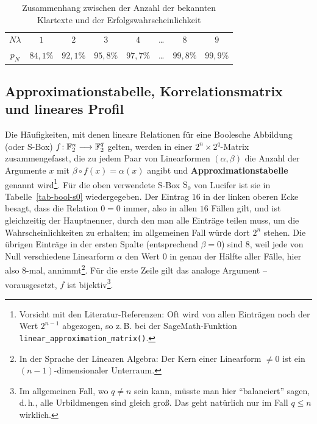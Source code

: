 \begin{refsegment}
\begin{table}
\begin{center}
  \begin{tabular}{|c|ccccccc|} \hline
		$N\lambda$ & $1$ & $2$ & $3$ & $4$ & \ldots & $8$ & $9$ \\
		$p_N$ & $84,1\%$ & $92,1\%$ & $95,8\%$ & $97,7\%$ & \ldots &
		                      $99,8\%$ & $99,9\%$ \\ \hline
  \end{tabular}
\end{center}
\caption{Zusammenhang zwischen der Anzahl der bekannten
   Klartexte
   und der Erfolgs\-wahr\-schein\-lich\-keit}\label{tab-bool-N}
\end{table}

\subsection{Approximationstabelle,
   Korrelationsmatrix und lineares
   Profil}\label{ss-bool-lpr}

Die Häufigkeiten, mit denen lineare
Relationen für eine Boolesche
Abbildung
(oder S-Box) $f\!: \mathbb{F}_2^n \longrightarrow \mathbb{F}_2^q$ gelten, werden
in einer $2^n \times 2^q$-Matrix zusammengefasst, die zu
jedem Paar von Linearformen $(\alpha,\beta)$
die Anzahl der Argumente $x$ mit $\beta\circ f(x) = \alpha(x)$ angibt und
{\bf Approximationstabelle}
genannt wird\footnote{%
   Vorsicht mit den Literatur-Referenzen: Oft wird von allen Einträgen
   noch der Wert $2^{n-1}$ abgezogen, so z.\,B. bei der SageMath-Funktion
   {\tt linear\_approximation\_matrix()}.
}\label{fn-lin-appr}.
Für die oben verwendete S-Box $\mathrm{S}_0$ von {\sc Lucifer}
ist sie in Tabelle~\ref{tab-bool-s0} wiedergegeben. Der Eintrag $16$ in
der linken oberen Ecke besagt, dass die Relation $0 = 0$ immer, also
in allen $16$ Fällen gilt, und ist gleichzeitig der Hauptnenner, durch
den man alle Einträge teilen muss, um die Wahrscheinlichkeiten zu
erhalten; im allgemeinen Fall würde dort $2^n$ stehen. Die übrigen Einträge
in der ersten Spalte (entsprechend $\beta = 0$) sind $8$, weil jede von Null
verschiedene Linearform $\alpha$ den Wert $0$ in genau der
Hälfte aller Fälle, hier also $8$-mal, annimmt\footnote{%
   In der Sprache der Linearen Algebra:
   Der Kern einer Linearform $\neq 0$
   ist ein $(n-1)$-dimensionaler Unterraum.
}. Für die erste Zeile gilt das analoge
Argument -- vorausgesetzt, $f$ ist bijektiv\footnote{%
   Im allgemeinen Fall, wo $q \neq n$ sein kann, müsste man hier
   "`balanciert"' sagen, d.\,h., alle Urbildmengen sind gleich groß.
   Das geht natürlich nur im Fall $q \leq n$ wirklich.
}.


\end{refsegment}
